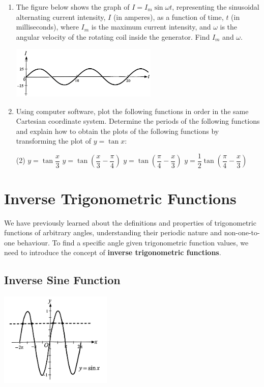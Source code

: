 \documentclass{report}
\begin{document}
\begin{enumerate}
            \item The figure below shows the graph of \( I=I_m \sin \omega t \), representing the sinusoidal alternating current intensity, \( I \) (in amperes), as a function of time, \( t \) (in milliseconds), where \( I_m \) is the maximum current intensity, and \( \omega \) is the angular velocity of the rotating coil inside the generator. Find \( I_m \) and \( \omega \).
            \begin{center}
                \includegraphics[width=0.55\textwidth]{assets/9-34.jpg}
            \end{center}

            \item Using computer software, plot the following functions in order in the same Cartesian coordinate system. Determine the periods of the following functions and explain how to obtain the plots of the following functions by transforming the plot of \( y=\tan x \):
            \begin{tasks}[label=(\alph*)](2)
                \task \( y=\tan \dfrac{x}{3} \)
                \task \( y=\tan \left(\dfrac{x}{3}-\dfrac{\pi}{4}\right) \)
                \task \( y=\tan \left(\dfrac{\pi}{4}-\dfrac{x}{3}\right) \)
                \task \( y=\dfrac{1}{2} \tan \left(\dfrac{\pi}{4}-\dfrac{x}{3}\right) \)
            \end{tasks}
        \end{enumerate}

        \section{Inverse Trigonometric Functions}

        We have previously learned about the definitions and properties of trigonometric functions of arbitrary angles, understanding their periodic nature and non-one-to-one behaviour. To find a specific angle given trigonometric function values, we need to introduce the concept of \textbf{inverse trigonometric functions}.

        \subsection*{Inverse Sine Function}
        \begin{center}
            \includegraphics[width=0.4\textwidth]{assets/9-35.jpg}
        \end{center}
\end{document}

